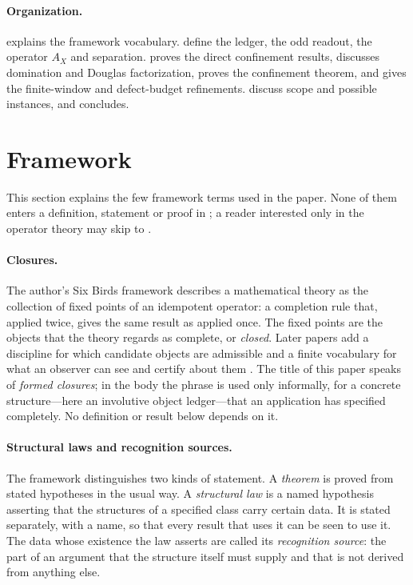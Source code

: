 \documentclass[11pt]{article}
\newcommand{\AX}{A_{X}}
\theoremstyle{definition}
\begin{document}
\paragraph{Organization.}
 explains the framework vocabulary.
 define the
ledger, the odd readout, the operator \(\AX\) and separation.
 proves the direct confinement results,
 discusses domination and Douglas factorization,
 proves the confinement theorem, and
 gives the finite-window and
defect-budget refinements.   discuss
scope and possible instances, and  concludes.
 \section{Framework}
\label{sec:framework}

This section explains the few framework terms used in the paper.
None of them enters a definition, statement or proof in
;
a reader interested only in the operator theory may skip to
.

\paragraph{Closures.}
The author's Six Birds framework \citep{TsiokosFoundationsI2026}
describes a mathematical theory as the collection of fixed points of an
idempotent operator: a completion rule that, applied twice, gives the
same result as applied once.  The fixed points are the objects that the
theory regards as complete, or \emph{closed}.  Later papers add a
discipline for which candidate objects are admissible
\citep{TsiokosFoundationsII2026} and a finite vocabulary for what an
observer can see and certify about them
\citep{TsiokosFoundationsIII2026}.  The title of this paper speaks of
\emph{formed closures}; in the body the phrase is used only informally,
for a concrete structure---here an involutive object ledger---that an
application has specified completely.  No definition or result below
depends on it.

\paragraph{Structural laws and recognition sources.}
The framework distinguishes two kinds of statement.  A \emph{theorem}
is proved from stated hypotheses in the usual way.  A \emph{structural
law} is a named hypothesis asserting that the structures of a
specified class carry certain data.  It is stated separately, with a
name, so that every result that uses it can be seen to use it.  The
data whose existence the law asserts are called its \emph{recognition
source}: the part of an argument that the structure itself must
supply and that is not derived from anything else.
\end{document}
